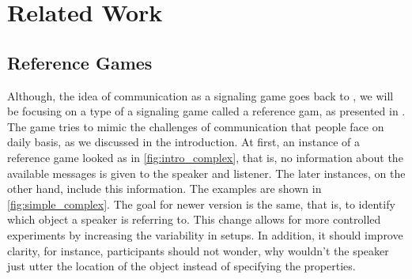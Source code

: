 ﻿\chapter{Related Work}
\section{Reference Games}
Although, the idea of communication as a signaling game goes back to \cite{Lewis_1969}, we will be focusing on a type of a signaling game called a reference gam, as presented in \cite{Frank_2012}. The game tries to mimic the challenges of communication that people face on daily basis, as we discussed in the introduction. At first, an instance of a reference game looked as in \autoref{fig:intro_complex}, that is, no information about the available messages is given to the speaker and listener. The later instances, on the other hand, include this information. The examples are shown in \autoref{fig:simple_complex}. The goal for newer version is the same, that is, to identify which object a speaker is referring to. This change allows for more controlled experiments by increasing the variability in setups. In addition, it should improve clarity, for instance, participants should not wonder, why wouldn't the speaker just utter the location of the object instead of specifying the properties.

